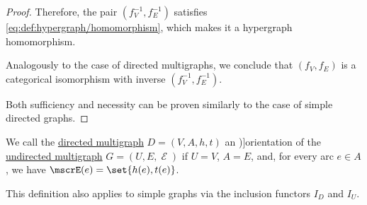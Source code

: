 \begin{proof}
  Therefore, the pair \( (f_V^{-1}, f_E^{-1}) \) satisfies \eqref{eq:def:hypergraph/homomorphism}, which makes it a hypergraph homomorphism.

  Analogously to the case of directed multigraphs, we conclude that \( (f_V, f_E) \) is a categorical isomorphism with inverse \( (f_V^{-1}, f_E^{-1}) \).

   Both sufficiency and necessity can be proven similarly to the case of simple directed graphs.
\end{proof}

\begin{definition}\label{def:multigraph_orientation}
  We call the \hyperref[def:directed_multigraph]{directed multigraph} \( D = (V, A, h, t) \) an \term[ru=ориентация (\cite[32]{ЕмеличевИПр1990Графы})]{orientation} of the \hyperref[def:hypergraph/multigraph]{undirected multigraph} \( G = (U, E, \mscrE) \) if \( U = V \), \( A = E \), and, for every arc \( e \in A \), we have \( \mscrE(e) = \set{ h(e), t(e) } \).
\end{definition}
\begin{comments}
  \item This definition also applies to simple graphs via the inclusion functors \hyperref[def:graph_functors/directed_inclusion]{\( I_D \)} and \hyperref[def:graph_functors/undirected_inclusion]{\( I_U \)}.
\end{comments}

